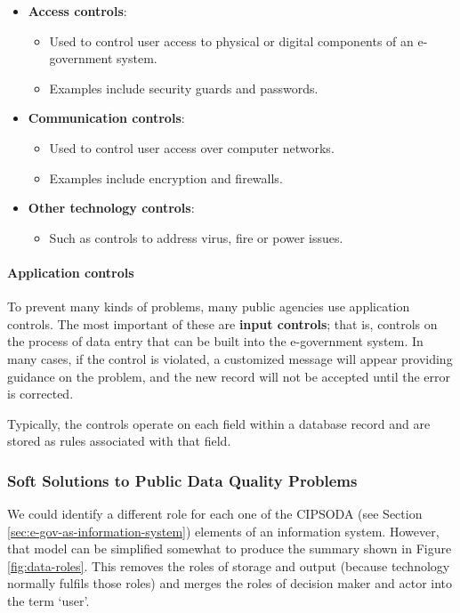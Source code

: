 \begin{itemize}
	\item \textbf{Access controls}:
	\begin{itemize}
		\item Used to control user access to physical or digital components	of an e-government system. 
		\item Examples include security guards and passwords.
	\end{itemize}

\item \textbf{Communication controls}:
\begin{itemize}
	\item Used to control user access over computer networks.
	\item Examples include encryption and firewalls.
\end{itemize}
\item \textbf{Other technology controls}:
\begin{itemize}
	\item Such as controls to address virus, fire or power issues.
\end{itemize}
\end{itemize}


\paragraph*{Application controls}
To prevent many kinds of problems, many public agencies use application controls. The most important of these are \textbf{input controls}; that is, controls on the process of data entry that can be built into the e-government system. In many cases, if the control is violated, a customized message will appear providing guidance on the problem, and the new record will not be accepted until the error is corrected. 

Typically, the controls operate on each field within a database record and are stored as rules associated with that field.


\subsubsection[Soft Solutions]{Soft Solutions to Public Data Quality Problems}
We could identify a different role for each one of the CIPSODA (see Section \ref{sec:e-gov-as-information-system}) elements of an information system. However, that model can be simplified somewhat to produce the summary shown in Figure \ref{fig:data-roles}. This removes the roles of storage and output (because technology normally fulfils those roles) and merges the roles of decision maker and actor into the term `user'.


